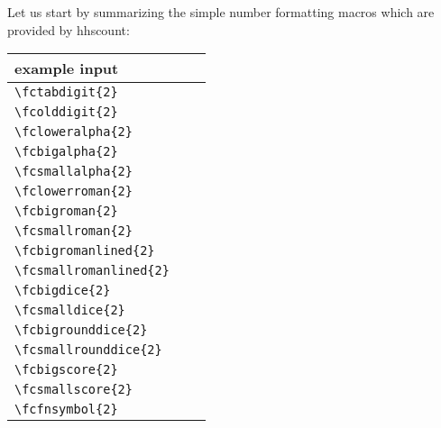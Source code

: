 \documentclass[11pt]{article}
\def\packagename#1{{\sffamily #1}}     %
\def\hhscount{\packagename{hhscount}\xspace}
\def\={\verb=}
\begin{document}
Let us start by summarizing the simple
number formatting macros which are provided by \hhscount:
\begin{center}
\begin{tabular}{|l|c||c|}\hline
  example input         & \vbox{\hbox{corresp.\strut}%
                            \hbox{output\strut}} &
                                               \vbox{\hbox{other example\strut}%
                                                     \hbox{output\strut}} \\
\hline\hline
  \=\fctabdigit{2}=      & \fctabdigit{2}        & \fctabdigit{29}       \\
\hline
  \=\fcolddigit{2}=      & \fcolddigit{2}        & \fcolddigit{29}       \\
\hline
  \=\fcloweralpha{2}=    & \fcloweralpha{2}      & \fcloweralpha{29}     \\
\hline
  \=\fcbigalpha{2}=      & \fcbigalpha{2}        & \fcbigalpha{29}       \\
\hline
  \=\fcsmallalpha{2}=    & \fcsmallalpha{2}      & \fcsmallalpha{29}     \\
\hline
  \=\fclowerroman{2}=    & \fclowerroman{2}      & \fclowerroman{29}     \\
\hline
  \=\fcbigroman{2}=      & \fcbigroman{2}        & \fcbigroman{29}       \\
\hline
  \=\fcsmallroman{2}=    & \fcsmallroman{2}      & \fcsmallroman{29}     \\
\hline
  \=\fcbigromanlined{2}= & \fcbigromanlined{2}   & \fcbigromanlined{29}  \\
\hline
  \=\fcsmallromanlined{2}= & \fcsmallromanlined{2} & \fcsmallromanlined{29} \\
\hline
  \=\fcbigdice{2}=       & \fcbigdice{2}         & \fcbigdice{29}        \\
\hline
  \=\fcsmalldice{2}=     & \fcsmalldice{2}       & \fcsmalldice{29}      \\
\hline
  \=\fcbigrounddice{2}=  & \fcbigrounddice{2}    & \fcbigrounddice{29}   \\
\hline
  \=\fcsmallrounddice{2}= & \fcsmallrounddice{2} & \fcsmallrounddice{29} \\
\hline
  \=\fcbigscore{2}=      & \fcbigscore{2}        & \fcbigscore{29}       \\
\hline
  \=\fcsmallscore{2}=    & \fcsmallscore{2}      & \fcsmallscore{29}     \\
\hline
  \=\fcfnsymbol{2}=      & \fcfnsymbol{2}        &                       \\
\hline
\end{tabular}
\end{center}
\end{document}
